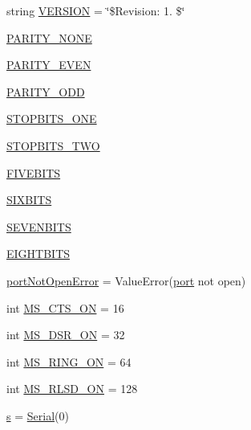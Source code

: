 \begin{DoxyCompactItemize}
\item 
string \hyperlink{namespaceserial_1_1serialwin32_abab57d82bb0b959e172e6e85644adf71}{V\+E\+R\+S\+I\+ON} = \char`\"{}\$Revision\+: 1. \$\char`\"{}
\item 
\hyperlink{namespaceserial_1_1serialwin32_a3262413e04005207c48aa488bc61f345}{P\+A\+R\+I\+T\+Y\+\_\+\+N\+O\+NE}
\item 
\hyperlink{namespaceserial_1_1serialwin32_a3987b42c1108f6a8d11b720f63101a98}{P\+A\+R\+I\+T\+Y\+\_\+\+E\+V\+EN}
\item 
\hyperlink{namespaceserial_1_1serialwin32_a4f6c2910ae24c9a599633c82e86efa14}{P\+A\+R\+I\+T\+Y\+\_\+\+O\+DD}
\item 
\hyperlink{namespaceserial_1_1serialwin32_a018c7f180189d6baa881646f60ade0ff}{S\+T\+O\+P\+B\+I\+T\+S\+\_\+\+O\+NE}
\item 
\hyperlink{namespaceserial_1_1serialwin32_a21bb0fdf96f6cfb4cf75cb380b321661}{S\+T\+O\+P\+B\+I\+T\+S\+\_\+\+T\+WO}
\item 
\hyperlink{namespaceserial_1_1serialwin32_af6d7987bfd20cc697d5e3e6962be62bd}{F\+I\+V\+E\+B\+I\+TS}
\item 
\hyperlink{namespaceserial_1_1serialwin32_ab71c3483d97fd752bf053f0768873470}{S\+I\+X\+B\+I\+TS}
\item 
\hyperlink{namespaceserial_1_1serialwin32_a9042b53be51d48791a00f253e23404bc}{S\+E\+V\+E\+N\+B\+I\+TS}
\item 
\hyperlink{namespaceserial_1_1serialwin32_af3a8a7578cf39e9b26901a2341af2ec8}{E\+I\+G\+H\+T\+B\+I\+TS}
\item 
\hyperlink{namespaceserial_1_1serialwin32_a18d3eeae695f6e06385f45f180164187}{port\+Not\+Open\+Error} = Value\+Error(\textquotesingle{}\hyperlink{z1_2i2c_8c_a9f33b3195a1fecb0b114222456959431}{port} not open\textquotesingle{})
\item 
int \hyperlink{namespaceserial_1_1serialwin32_a95299fa794686b635febcf3066482fa5}{M\+S\+\_\+\+C\+T\+S\+\_\+\+ON} = 16
\item 
int \hyperlink{namespaceserial_1_1serialwin32_a97a134843562e231ee3e03debfe6dd7e}{M\+S\+\_\+\+D\+S\+R\+\_\+\+ON} = 32
\item 
int \hyperlink{namespaceserial_1_1serialwin32_adab0184ba50588f127800d3c260f66b6}{M\+S\+\_\+\+R\+I\+N\+G\+\_\+\+ON} = 64
\item 
int \hyperlink{namespaceserial_1_1serialwin32_a5525b81dc601d0842adca09a634ace63}{M\+S\+\_\+\+R\+L\+S\+D\+\_\+\+ON} = 128
\item 
\hyperlink{namespaceserial_1_1serialwin32_aa695923c609abaebadb4bf849cb40247}{s} = \hyperlink{classserial_1_1serialwin32_1_1_serial}{Serial}(0)
\end{DoxyCompactItemize}


